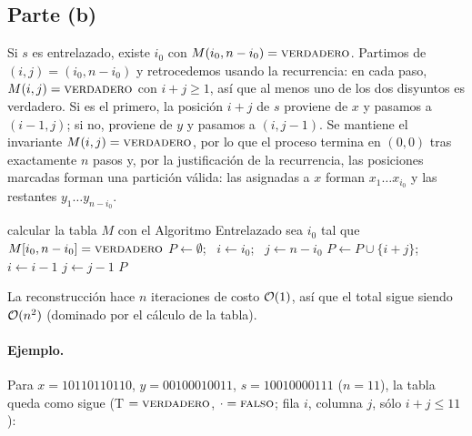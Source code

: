 \subsection*{Parte (b)}

Si $s$ es entrelazado, existe $i_0$ con $M(i_0,n-i_0)=\textsc{verdadero}$. Partimos de $(i,j)=(i_0,n-i_0)$ y
retrocedemos usando la recurrencia: en cada paso, $M(i,j)=\textsc{verdadero}$ con $i+j\ge1$, así que al menos uno de los
dos disyuntos es verdadero. Si es el primero, la posición $i+j$ de $s$ proviene de $x$ y pasamos a
$(i-1,j)$; si no, proviene de $y$ y pasamos a $(i,j-1)$. Se mantiene el invariante $M(i,j)=\textsc{verdadero}$, por lo
que el proceso termina en $(0,0)$ tras exactamente $n$ pasos y, por la justificación de la recurrencia, las
posiciones marcadas forman una partición válida: las asignadas a $x$ forman $x_1\dots x_{i_0}$ y las
restantes $y_1\dots y_{n-i_0}$.

\begin{algorithm}[H]
\caption{PosicionesDeX$(x,y,s)$}
\begin{algorithmic}[1]
\State calcular la tabla $M$ con el Algoritmo Entrelazado
\State sea $i_0$ tal que $M[i_0,n-i_0]=\textsc{verdadero}$ 
\State $P \gets \emptyset$; \ $i\gets i_0$; \ $j \gets n-i_0$
    \State $P \gets P\cup\{i+j\}$; \ $i\gets i-1$
  \Else {}
    \State $j\gets j-1$
  \EndIf
\EndWhile
\State \Return $P$
\end{algorithmic}
\end{algorithm}

La reconstrucción hace $n$ iteraciones de costo $\mathcal{O}(1)$, así que el total sigue siendo $\mathcal{O}(n^2)$ (dominado
por el cálculo de la tabla).

\paragraph{Ejemplo.} Para $x = 10110110110$, $y = 00100010011$, $s = 10010000111$ ($n=11$), la tabla queda
como sigue (T $=\textsc{verdadero}$, $\cdot=\textsc{falso}$; fila $i$, columna $j$, sólo $i+j\le 11$):

